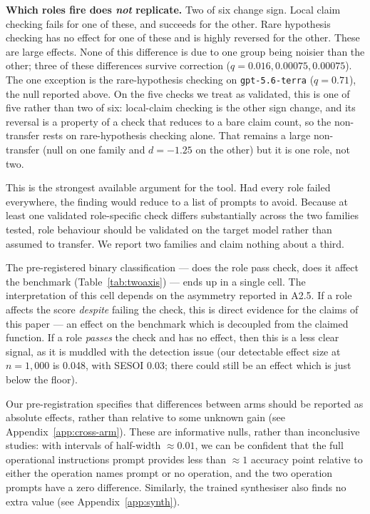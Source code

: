 \textbf{Which roles fire does \emph{not} replicate.} Two of six change sign. Local claim checking
fails for one of these, and succeeds for the other. Rare hypothesis checking has no effect for one
of these and is highly reversed for the other. These are large effects. None of this difference is
due to one group being noisier than the other; three of these differences survive correction
($q = 0.016, 0.00075, 0.00075$). The one exception is the rare-hypothesis checking on
\texttt{gpt-5.6-terra} ($q = 0.71$), the null reported above. On the five checks we treat as
validated, this is one of five rather than two of six: local-claim checking is the other sign
change, and its reversal is a property of a check that reduces to a bare claim count, so the
non-transfer rests on rare-hypothesis checking alone. That remains a large non-transfer (null on one
family and $d = -1.25$ on the other) but it is one role, not two.

This is the strongest available argument for the tool. Had every role failed everywhere, the finding
would reduce to a list of prompts to avoid. Because at least one validated role-specific check
differs substantially across the two families tested, role behaviour should be validated on the
target model rather than assumed to transfer. We report two families and claim nothing about a
third.

The pre-registered binary classification --- does the role pass check, does it affect the benchmark
(Table~\ref{tab:twoaxis}) --- ends up in a single cell. The interpretation of this cell depends on
the asymmetry reported in A2.5. If a role affects the score \emph{despite} failing the check, this
is direct evidence for the claims of this paper --- an effect on the benchmark which is decoupled
from the claimed function. If a role \emph{passes} the check and has no effect, then this is a less
clear signal, as it is muddled with the detection issue (our detectable effect size at
$n = 1{,}000$ is 0.048, with SESOI 0.03; there could still be an effect which is just below the
floor).

Our pre-registration specifies that differences between arms should be reported as absolute effects,
rather than relative to some unknown gain (see Appendix~\ref{app:cross-arm}). These are informative
nulls, rather than inconclusive studies: with intervals of half-width $\approx 0.01$, we can be
confident that the full operational instructions prompt provides less than $\approx 1$ accuracy
point relative to either the operation names prompt or no operation, and the two operation prompts
have a zero difference. Similarly, the trained synthesiser also finds no extra value (see
Appendix~\ref{app:synth}).

